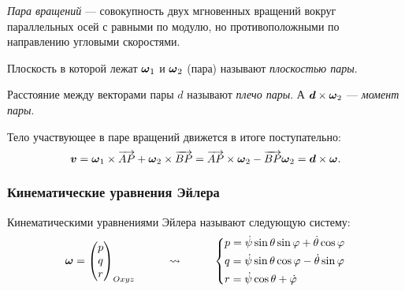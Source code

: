 \begin{to_def}
	\textit{Пара вращений} --- совокупность двух мгновенных вращений вокруг параллельных осей с равными по модулю, но противоположными по направлению угловыми скоростями.
\end{to_def}
\begin{to_def}
	Плоскость в которой лежат $\mbox{\boldmath $\omega$}_1$ и $\mbox{\boldmath $\omega$}_2$ (пара) называют \textit{плоскостью пары}.
\end{to_def}
\begin{to_def}
	Расстояние между векторами пары $d$ называют \textit{плечо пары}. А $\mbox{\boldmath $d$} \times \mbox{\boldmath $\omega$}_2$ --- \textit{момент пары}.
\end{to_def}
Тело участвующее в паре вращений движется в итоге поступательно:
\begin{equation*}
	\mbox{\boldmath $v$} = \mbox{\boldmath $\omega$}_1 \times \overrightarrow{AP} + \mbox{\boldmath $\omega$}_2 \times \overrightarrow {B P} = \overrightarrow {A P} \times \mbox{\boldmath $\omega$}_2 - \overrightarrow {B P} \mbox{\boldmath $\omega$}_2 = \mbox{\boldmath $d$} \times \mbox{\boldmath $\omega$}.
\end{equation*}

\subsubsection*{Кинематические уравнения Эйлера}
\begin{to_def}
	Кинематическими уравнениями Эйлера называют следующую систему:
	\begin{equation*}
		\mbox{\boldmath $\omega$} = \begin{pmatrix}
			p \\ q \\ r
		\end{pmatrix}_{O xyz}
		\hspace*{1 cm}
		\leadsto
		\hspace*{1 cm}
		\left\{\begin{aligned}
			&p = \dot{\psi} \sin \theta \sin \varphi + \dot{\theta} \cos \varphi
			\\
			&q = \dot{\psi} \sin \theta \cos \varphi - \dot{\theta} \sin \varphi
			\\
			&r = \dot{\psi} \cos \theta + \dot{\varphi}
		\end{aligned}\right.
	\end{equation*}
 
\end{to_def}
 